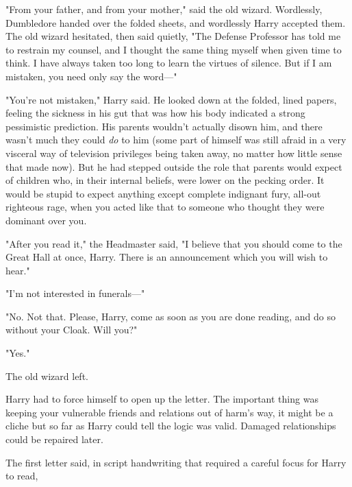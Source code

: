 "From your father, and from your mother," said the old wizard. Wordlessly, 
Dumbledore handed over the folded sheets, and wordlessly Harry accepted them. 
The old wizard hesitated, then said quietly, "The Defense Professor has told me 
to restrain my counsel, and I thought the same thing myself when given time to 
think. I have always taken too long to learn the virtues of silence. But if I 
am mistaken, you need only say the word---"

"You're not mistaken," Harry said. He looked down at the folded, lined papers, 
feeling the sickness in his gut that was how his body indicated a strong 
pessimistic prediction. His parents wouldn't actually disown him, and there 
wasn't much they could \emph{do} to him (some part of himself was still afraid 
in a very visceral way of television privileges being taken away, no matter how 
little sense that made now). But he had stepped outside the role that parents 
would expect of children who, in their internal beliefs, were lower on the 
pecking order. It would be stupid to expect anything except complete indignant 
fury, all-out righteous rage, when you acted like that to someone who thought 
they were dominant over you.

"After you read it," the Headmaster said, "I believe that you should come to 
the Great Hall at once, Harry. There is an announcement which you will wish to 
hear."

"I'm not interested in funerals---"

"No. Not that. Please, Harry, come as soon as you are done reading, and do so 
without your Cloak. Will you?"

"Yes."

The old wizard left.

Harry had to force himself to open up the letter. The important thing was 
keeping your vulnerable friends and relations out of harm's way, it might be a 
cliche but so far as Harry could tell the logic was valid. Damaged 
relationships could be repaired later.

The first letter said, in script handwriting that required a careful focus for 
Harry to read,


